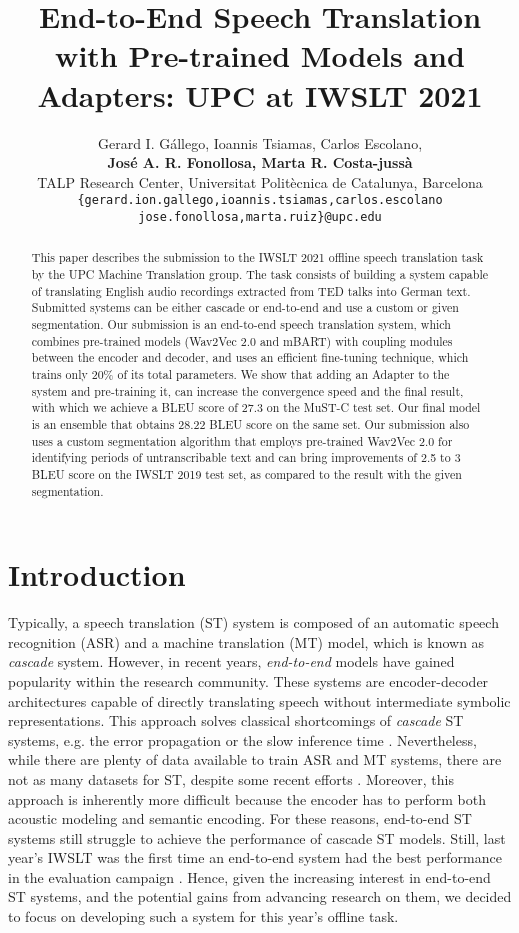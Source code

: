 \documentclass[11pt,a4paper]{article}
\title{End-to-End Speech Translation with Pre-trained Models and Adapters: UPC at IWSLT 2021}
\author{
  Gerard I. Gállego, Ioannis Tsiamas, Carlos Escolano,\\\textbf{José A. R. Fonollosa, Marta R. Costa-jussà} \\
  TALP Research Center, Universitat Politècnica de Catalunya, Barcelona \\
  \texttt{\{gerard.ion.gallego,ioannis.tsiamas,carlos.escolano}\\\texttt{jose.fonollosa,marta.ruiz\}@upc.edu} \\
}
\date{}
\begin{document}
\maketitle

\begin{abstract}
This paper describes the submission to the IWSLT 2021 offline speech translation task by the UPC Machine Translation group. The task consists of building a system capable of translating English audio recordings extracted from TED talks into German text. Submitted systems can be either cascade or end-to-end and use a custom or given segmentation. Our submission is an end-to-end speech translation system, which combines pre-trained models (Wav2Vec 2.0 and mBART) with coupling modules between the encoder and decoder, and uses an efficient fine-tuning technique, which trains only 20\% of its total parameters. We show that adding an Adapter to the system and pre-training it, can increase the convergence speed and the final result, with which we achieve a BLEU score of 27.3 on the MuST-C test set. Our final model is an ensemble that obtains 28.22 BLEU score on the same set. Our submission also uses a custom segmentation algorithm that employs pre-trained Wav2Vec 2.0 for identifying periods of untranscribable text and can bring improvements of 2.5 to 3 BLEU score on the IWSLT 2019 test set, as compared to the result with the given segmentation.

\end{abstract}


\section{Introduction}

    Typically, a speech translation (ST) system is composed of an automatic speech recognition (ASR) and a machine translation (MT) model, which is known as \textit{cascade} system. However, in recent years, \textit{end-to-end} models have gained popularity within the research community. These systems are encoder-decoder architectures capable of directly translating speech without intermediate symbolic representations. This approach solves classical shortcomings of \textit{cascade} ST systems, e.g. the error propagation or the slow inference time \cite{end2end-st}. Nevertheless, while there are plenty of data available to train ASR and MT systems, there are not as many datasets for ST, despite some recent efforts \cite{mustc,covost}. Moreover, this approach is inherently more difficult because the encoder has to perform both acoustic modeling and semantic encoding. For these reasons, end-to-end ST systems still struggle to achieve the performance of cascade ST models. Still, last year's IWSLT was the first time an end-to-end system had the best performance in the evaluation campaign \cite{best_iwslt2020,iwslt2020}. Hence, given the increasing interest in end-to-end ST systems, and the potential gains from advancing research on them, we decided to focus on developing such a system for this year's offline task.
\end{document}
